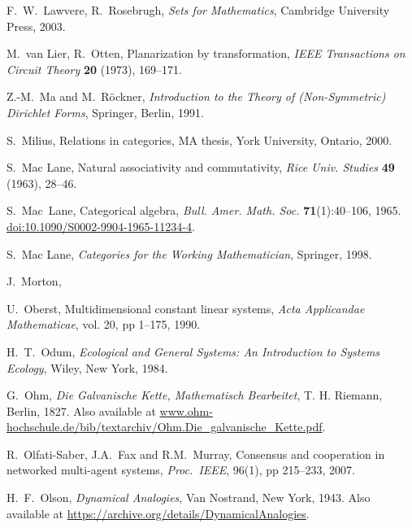 \begin{thebibliography}{RSW00}
     F.\ W.\ Lawvere, R.\ Rosebrugh, \emph{Sets for Mathematics},
    Cambridge University Press, 2003.

     M.\ van Lier, R.\ Otten, Planarization by transformation, {\sl
    IEEE Transactions on Circuit Theory} {\bf 20} (1973), 169--171.

     Z.-M.\ Ma and M.\ R\"ockner, {\sl Introduction to the Theory of
    (Non-Symmetric) Dirichlet Forms}, Springer, Berlin, 1991.

     S.\ Milius, Relations in categories, MA thesis, York University,
    Ontario, 2000.


     S.\ Mac Lane, Natural associativity and commutativity, {\sl
    Rice Univ. Studies} {\bf 49} (1963), 28--46. 

     S.\ Mac\ Lane, Categorical algebra, \emph{Bull. Amer. Math. Soc.}
    {\bf 71}(1):40--106, 1965.
    \href{http://doi.org/10.1090/S0002-9904-1965-11234-4}{doi:10.1090/S0002-9904-1965-11234-4}.

     S.\ Mac Lane, {\sl Categories for the Working Mathematician},
    Springer, 1998.

     J.\ Morton, 

     U.\ Oberst, Multidimensional constant linear systems, \emph{Acta
    Applicandae Mathematicae}, vol. 20, pp 1--175, 1990.


     H.\ T.\ Odum, {\sl Ecological and General Systems: An
    Introduction to Systems Ecology}, Wiley, New York, 1984.

     G.\ Ohm, {\sl Die Galvanische Kette, Mathematisch Bearbeitet},
    T. H. Riemann, Berlin, 1827.  Also available at
    \href{http://www.ohm-hochschule.de/bib/textarchiv/Ohm.Die_galvanische_Kette.pdf}{www.ohm-hochschule.de/bib/textarchiv/Ohm.Die\_galvanische\_Kette.pdf}.

     R.\ Olfati-Saber, J.A.\ Fax and R.M.\ Murray, Consensus and
    cooperation in networked multi-agent systems, \emph{Proc.\ IEEE}, 96(1), pp 215--233, 2007.

     H.\ F.\ Olson, {\sl Dynamical Analogies}, Van
    Nostrand, New York, 1943.  Also available at 
    \href{https://archive.org/details/DynamicalAnalogies}
    {https://archive.org/details/DynamicalAnalogies}.



\end{thebibliography}
